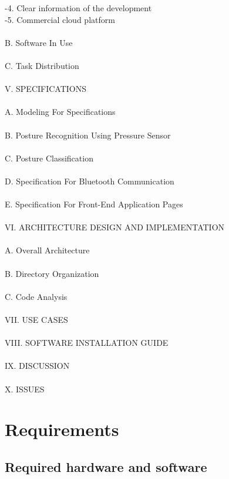 \documentclass[conference]{IEEEtran}
\begin{document}
-4. Clear information of the development\\

-5. Commercial cloud platform\\\\
B. Software In Use\\\\
C. Task Distribution\\\\


V.	SPECIFICATIONS\\\\
A. Modeling For Specifications\\\\
B. Posture Recognition Using Pressure Sensor\\\\
C. Posture Classification\\\\
D. Specification For Bluetooth Communication\\\\
E. Specification For Front-End Application Pages\\\\


VI. ARCHITECTURE DESIGN AND IMPLEMENTATION\\\\
A. Overall Architecture\\\\
B. Directory Organization\\\\
C. Code Analysis\\\\


VII. USE CASES\\\\


VIII. SOFTWARE INSTALLATION GUIDE\\\\


IX. DISCUSSION\\\\

X. ISSUES

\clearpage

\section{Requirements}

\subsection{Required hardware and software}
\end{document}
